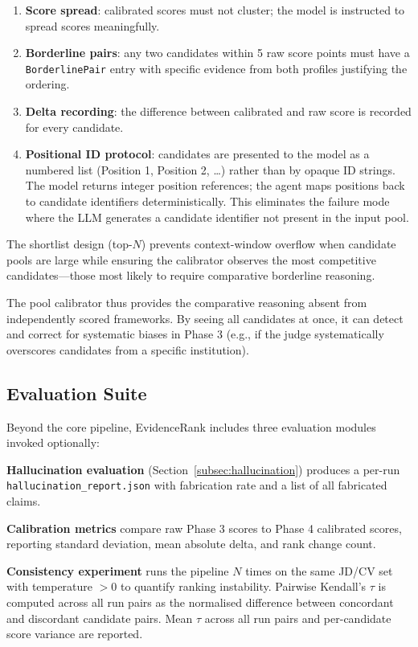 \documentclass[journal]{IEEEtran}
\begin{document}
\begin{enumerate}
  \item \textbf{Score spread}: calibrated scores must not cluster; the model is
        instructed to spread scores meaningfully.
  \item \textbf{Borderline pairs}: any two candidates within 5 raw score points
        must have a \texttt{BorderlinePair} entry with specific evidence from both
        profiles justifying the ordering.
  \item \textbf{Delta recording}: the difference between calibrated and raw score
        is recorded for every candidate.
  \item \textbf{Positional ID protocol}: candidates are presented to the model as
        a numbered list (Position 1, Position 2, \ldots) rather than by opaque ID
        strings. The model returns integer position references; the agent maps
        positions back to candidate identifiers deterministically. This eliminates
        the failure mode where the LLM generates a candidate identifier not present
        in the input pool.
\end{enumerate}

The shortlist design (top-$N$) prevents context-window overflow when candidate
pools are large while ensuring the calibrator observes the most competitive
candidates—those most likely to require comparative borderline reasoning.

The pool calibrator thus provides the comparative reasoning absent from
independently scored frameworks. By seeing all candidates at once, it can detect
and correct for systematic biases in Phase 3 (e.g., if the judge systematically
overscores candidates from a specific institution).

\subsection{Evaluation Suite}

Beyond the core pipeline, EvidenceRank includes three evaluation modules invoked
optionally:

\textbf{Hallucination evaluation} (Section~\ref{subsec:hallucination}) produces
a per-run \texttt{hallucination\_report.json} with fabrication rate and a list of
all fabricated claims.

\textbf{Calibration metrics} compare raw Phase 3 scores to Phase 4 calibrated
scores, reporting standard deviation, mean absolute delta, and rank change count.

\textbf{Consistency experiment} runs the pipeline $N$ times on the same
JD/CV set with temperature $> 0$ to quantify ranking instability. Pairwise
Kendall's $\tau$ is computed across all run pairs as the normalised difference
between concordant and discordant candidate pairs. Mean $\tau$ across all run
pairs and per-candidate score variance are reported.
\end{document}
